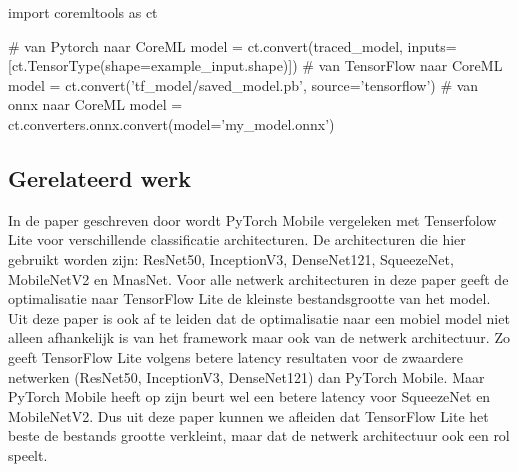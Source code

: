 \begin{python}
import coremltools as ct

# van Pytorch naar CoreML
model = ct.convert(traced_model, inputs=[ct.TensorType(shape=example_input.shape)])
# van TensorFlow naar CoreML
model = ct.convert('tf_model/saved_model.pb', source='tensorflow')
# van onnx naar CoreML
model  = ct.converters.onnx.convert(model='my_model.onnx')
\end{python}



\subsection{Gerelateerd werk}
In de paper geschreven door \cite{luo_comparison_2020} wordt PyTorch Mobile vergeleken met Tenserfolow Lite voor verschillende classificatie architecturen.
De architecturen die hier gebruikt worden zijn: ResNet50, InceptionV3, DenseNet121, SqueezeNet, MobileNetV2 en MnasNet.
Voor alle netwerk architecturen in deze paper geeft de optimalisatie naar TensorFlow Lite de kleinste bestandsgrootte van het model. 
Uit deze paper is ook af te leiden dat de optimalisatie naar een mobiel model niet alleen afhankelijk is van het framework maar ook van de netwerk architectuur.
Zo geeft TensorFlow Lite volgens \cite{luo_comparison_2020} betere latency resultaten voor de zwaardere netwerken (ResNet50, InceptionV3, DenseNet121) dan PyTorch Mobile.
Maar PyTorch Mobile heeft op zijn beurt wel een betere latency voor SqueezeNet en MobileNetV2.
Dus uit deze paper kunnen we afleiden dat TensorFlow Lite het beste de bestands grootte verkleint, maar dat de netwerk architectuur ook een rol speelt.

